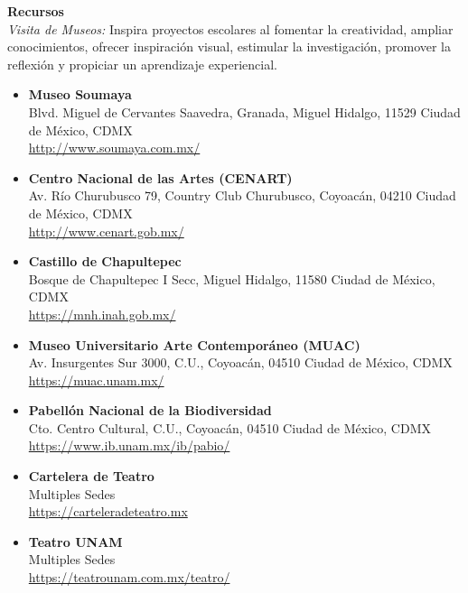 {\large \textbf{Recursos}}\\
\textit{Visita de Museos:}  Inspira proyectos escolares al fomentar la creatividad, ampliar conocimientos, ofrecer inspiración visual, estimular la investigación, promover la reflexión y propiciar un aprendizaje experiencial.
\begin{itemize}
    \item \textbf{Museo Soumaya} \\ 
    Blvd. Miguel de Cervantes Saavedra, Granada, Miguel Hidalgo, 11529 Ciudad de México, CDMX \\
    \url{http://www.soumaya.com.mx/}
    \item \textbf{Centro Nacional de las Artes (CENART)} \\ Av. Río Churubusco 79, Country Club Churubusco, Coyoacán, 04210 Ciudad de México, CDMX \\
    \url{http://www.cenart.gob.mx/}

    \item \textbf{Castillo de Chapultepec}\\
    Bosque de Chapultepec I Secc, Miguel Hidalgo, 11580 Ciudad de México, CDMX \\
    \url{https://mnh.inah.gob.mx/}
    \item \textbf{Museo Universitario Arte Contemporáneo (MUAC)}\\
    Av. Insurgentes Sur 3000, C.U., Coyoacán, 04510 Ciudad de México, CDMX \\
    \url{https://muac.unam.mx/}
    \item \textbf{Pabellón Nacional de la Biodiversidad}\\
    Cto. Centro Cultural, C.U., Coyoacán, 04510 Ciudad de México, CDMX
    \\ 
    \url{https://www.ib.unam.mx/ib/pabio/}
    \item \textbf{Cartelera de Teatro }\\
    Multiples Sedes \\
    \url{https://carteleradeteatro.mx}

    \item \textbf{Teatro UNAM}\\
    Multiples Sedes
    \\
    \url{https://teatrounam.com.mx/teatro/}
\end{itemize}


\newpage
